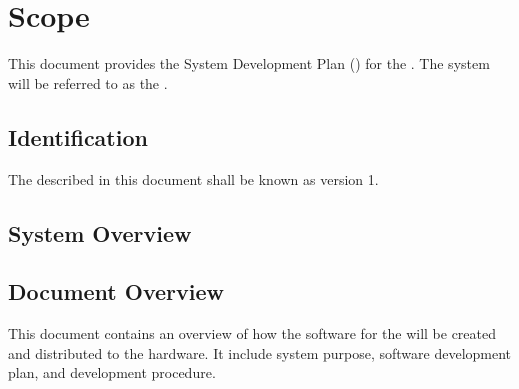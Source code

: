 
\chapter{Scope}
\label{loc:Scope}
% 

This document provides the System Development Plan (\SDP) for the \ThisSystem. 
The system will be referred to as the \ThisSys.

\section{Identification}
\label{loc:Identification}
% 

The \ThisSystem described in this document shall be known as \ThisSys version 1.


\section{System Overview}
\label{loc:SystemOverview}
% 




\section{Document Overview}
\label{loc:DocumentOverview}
% 

This document contains an overview of how the software for the \ThisSystem will be created and distributed to the hardware. It include system purpose, software development plan, and development procedure.

% 

% 

% 

